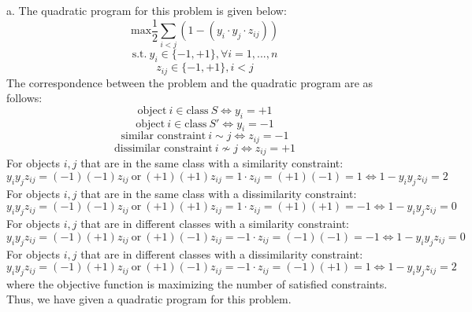 \documentclass[oneside]{homework} %
\begin{document}
{\large a.} The quadratic program for this problem is given below:
$$\text{max}\frac{1}{2}\sum\limits_{i<j}(1 -(y_i \cdot y_j \cdot z_{ij}))$$
$$\text{s.t.} \ y_i \in \{-1, +1\}, \forall i = 1,...,n$$
$$z_{ij} \in \{-1, +1\}, i < j$$
The correspondence between the problem and the quadratic program are as follows:
$$\text{object} \ i \in \text{class} \ S \Leftrightarrow y_i = +1$$
$$\text{object} \ i \in \text{class} \ S' \Leftrightarrow y_i = -1$$
$$\text{similar constraint} \ i \sim j \Leftrightarrow z_{ij} = -1$$
$$\text{dissimilar constraint} \ i \nsim j \Leftrightarrow z_{ij} = +1$$ 
\newline
For objects $i, j$ that are in the same class with a similarity constraint: $$y_i y_j z_{ij} = (-1)(-1)z_{ij} \ \text{or} \ (+1)(+1)z_{ij} = 1 \cdot z_{ij} = (+1)(-1) = 1 \Leftrightarrow 1 - y_i y_j z_{ij} = 2$$
For objects $i, j$ that are in the same class with a dissimilarity constraint: $$y_i y_j z_{ij} = (-1)(-1)z_{ij} \ \text{or} \ (+1)(+1)z_{ij} = 1 \cdot z_{ij} = (+1)(+1) = -1 \Leftrightarrow 1 - y_i y_j z_{ij} = 0$$
For objects $i, j$ that are in different classes with a similarity constraint: $$y_i y_j z_{ij} = (-1)(+1)z_{ij} \ \text{or} \ (+1)(-1)z_{ij} = -1 \cdot z_{ij} = (-1)(-1) = -1 \Leftrightarrow 1 - y_i y_j z_{ij} = 0$$
For objects $i, j$ that are in different classes with a dissimilarity constraint: $$y_i y_j z_{ij} = (-1)(+1)z_{ij} \ \text{or} \ (+1)(-1)z_{ij} = -1 \cdot z_{ij} = (-1)(+1) = 1 \Leftrightarrow 1 - y_i y_j z_{ij} = 2$$
where the objective function is maximizing the number of satisfied constraints. \newline
Thus, we have given a quadratic program for this problem.
\newline
\newline
\end{document}
